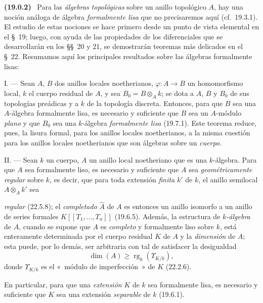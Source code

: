 \documentclass[10pt,oneside]{book}
\makeatletter
\newcommand{\setmanualcurrentlabel}[1]{\def\@currentlabel{#1}}
\newcommand{\oldpage}[2][]{%
  \setcounter{footnote}{0}%
  \marginpar{\scriptsize\textbf{#1}~|~#2}\ignorespaces}
\newenvironment{env}[1][]{\setmanualcurrentlabel{#1}\par\medskip\noindent\textbf{(#1)}\ }{\par}
\makeatother
\begin{document}
\begin{env}[19.0.2]
\label{0.19.0.2-es}
Para las \emph{álgebras topológicas} sobre un anillo topológico $A$, hay una
noción análoga de álgebra \emph{formalmente lisa} que no precisaremos
aquí (cf.~19.3.1). El estudio de estas nociones se hace primero desde un punto de vista
elemental en el §~19; luego, con ayuda de las propiedades de los diferenciales que
se desarrollarán en los §§~20 y 21, se demostrarán teoremas más delicados
en el §~22. Resumamos aquí los principales resultados sobre las álgebras formalmente
lisas:

\medskip\noindent I. --- Sean $A$, $B$ dos anillos locales
noetherianos, $\varphi:A\to B$ un homomorfismo local, $k$ el cuerpo residual de
$A$, y sea $B_0=B\otimes_A k$; se dota a $A$, $B$ y $B_0$ de sus
topologías preádicas y a $k$ de la topología discreta. Entonces, para que $B$ sea
una $A$-álgebra formalmente lisa, es necesario y suficiente que $B$ sea un
$A$-módulo \emph{plano} y que $B_0$ sea una $k$-álgebra \emph{formalmente
lisa} (19.7.1). Este teorema reduce, pues, la lisura formal, para los anillos
locales noetherianos, a la misma cuestión para los anillos locales noetherianos que
son álgebras sobre un \emph{cuerpo}.

\medskip\noindent II. --- Sean $k$ un cuerpo, $A$ un anillo local
noetheriano que es una $k$-álgebra. Para que $A$ sea formalmente liso, es
necesario y suficiente que $A$ sea \emph{geométricamente regular} sobre $k$,
es decir, que para toda extensión \emph{finita} $k'$ de $k$, el anillo
semilocal $A\otimes_A k'$ sea

\oldpage[0\textsubscript{IV-1}]{70}

\noindent \emph{regular} (22.5.8); el \emph{completado} $\widehat A$ de $A$ es entonces
un anillo isomorfo a un anillo de series formales
$K[[T_1,\ldots,T_n]]$ (19.6.5). Además, la estructura de \emph{$k$-álgebra} de $A$,
cuando se supone que $A$ es \emph{completo} y formalmente liso sobre $k$, está
enteramente determinada por el cuerpo residual $K$ de $A$ y la \emph{dimensión}
de $A$; esta puede, por lo demás, ser arbitraria con tal de satisfacer la
desigualdad
\[
  \dim(A)\geq \operatorname{rg}_k(\Upsilon_{K/k}),
\]
donde $\Upsilon_{K/k}$ es el «~módulo de imperfección~» de $K$ (22.2.6).

En particular, para que una \emph{extensión} $K$ de $k$ sea formalmente
lisa, es necesario y suficiente que $K$ sea una extensión \emph{separable} de $k$
(19.6.1).


\end{env}
\end{document}
